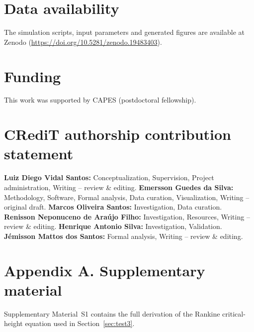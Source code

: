 \documentclass[preprint,review,12pt,authoryear]{elsarticle}
\begin{document}
\section*{Data availability}

The simulation scripts, input parameters and generated figures are available at Zenodo (\url{https://doi.org/10.5281/zenodo.19483403}).

\section*{Funding}

This work was supported by CAPES (postdoctoral fellowship).

\section*{CRediT authorship contribution statement}

\textbf{Luiz Diego Vidal Santos:} Conceptualization, Supervision, Project administration, Writing -- review \& editing. \textbf{Emersson Guedes da Silva:} Methodology, Software, Formal analysis, Data curation, Visualization, Writing -- original draft. \textbf{Marcos Oliveira Santos:} Investigation, Data curation. \textbf{Renisson Neponuceno de Ara\'{u}jo Filho:} Investigation, Resources, Writing -- review \& editing. \textbf{Henrique Antonio Silva:} Investigation, Validation. \textbf{J\'{e}misson Mattos dos Santos:} Formal analysis, Writing -- review \& editing.

\section*{Appendix A. Supplementary material}

Supplementary Material~S1 contains the full derivation of the Rankine critical-height equation used in Section~\ref{sec:test3}.



\end{document}
